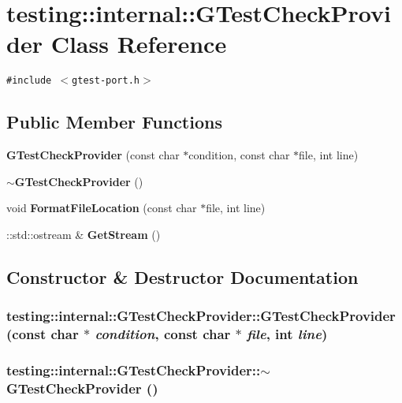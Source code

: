 \section{testing::internal::GTestCheckProvider Class Reference}
\label{classtesting_1_1internal_1_1GTestCheckProvider}
{\tt \#include $<$gtest-port.h$>$}

\subsection*{Public Member Functions}
\begin{CompactItemize}
\item 
{\bf GTestCheckProvider} (const char $\ast$condition, const char $\ast$file, int line)
\item 
{\bf $\sim$GTestCheckProvider} ()
\item 
void {\bf FormatFileLocation} (const char $\ast$file, int line)
\item 
::std::ostream \& {\bf GetStream} ()
\end{CompactItemize}


\subsection{Constructor \& Destructor Documentation}
\subsubsection{\setlength{\rightskip}{0pt plus 5cm}testing::internal::GTestCheckProvider::GTestCheckProvider (const char $\ast$ {\em condition}, const char $\ast$ {\em file}, int {\em line})\hspace{0.3cm}{\tt  [inline]}}\label{classtesting_1_1internal_1_1GTestCheckProvider_0d217fc3b141680c698c1b4b88e1e9f3}


\subsubsection{\setlength{\rightskip}{0pt plus 5cm}testing::internal::GTestCheckProvider::$\sim$GTestCheckProvider ()\hspace{0.3cm}{\tt  [inline]}}\label{classtesting_1_1internal_1_1GTestCheckProvider_389abd44d5f8b7878c607ac17887053b}




